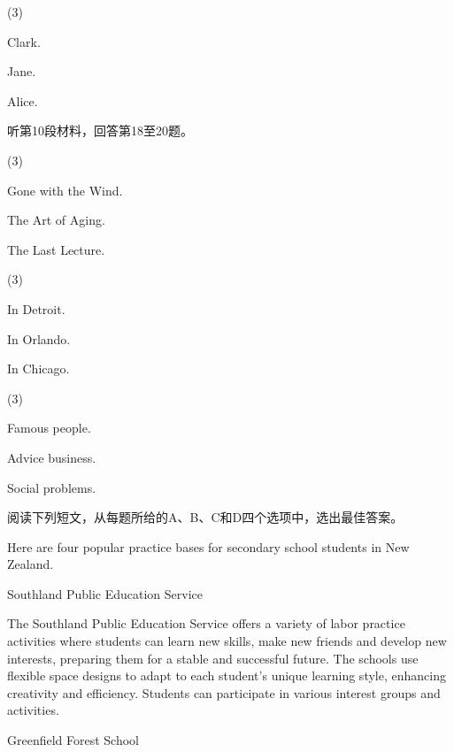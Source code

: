 \documentclass{英语试卷}
\begin{document}
\begin{choices}(3)
  \item Clark.
  \item Jane.
  \item Alice.
\end{choices}
\par 听第10段材料，回答第18至20题。\par
{}
\begin{choices}(3)
  \item Gone with the Wind.
  \item The Art of Aging.
  \item The Last Lecture.
\end{choices}
\begin{choices}(3)
  \item In Detroit.
  \item In Orlando.
  \item In Chicago.
\end{choices}
\begin{choices}(3)
  \item Famous people.
  \item Advice business.
  \item Social problems.
\end{choices}
\par 阅读下列短文，从每题所给的A、B、C和D四个选项中，选出最佳答案。\par
{}
\par Here are four popular practice bases for secondary school students in New Zealand.\par
\par Southland Public Education Service\par
\par The Southland Public Education Service offers a variety of labor practice activities where students can learn new skills, make new friends and develop new interests, preparing them for a stable and successful future. The schools use flexible space designs to adapt to each student's unique learning style, enhancing creativity and efficiency. Students can participate in various interest groups and activities.\par
\par Greenfield Forest School\par
\end{document}
